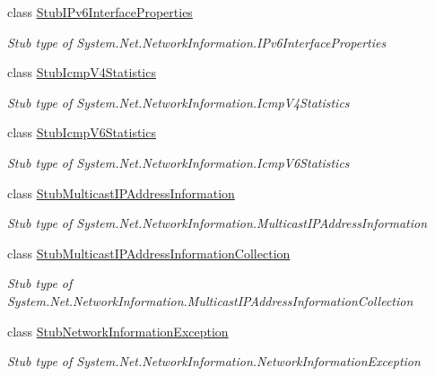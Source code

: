 \begin{DoxyCompactItemize}
class \hyperlink{class_system_1_1_net_1_1_network_information_1_1_fakes_1_1_stub_i_pv6_interface_properties}{Stub\-I\-Pv6\-Interface\-Properties}
\begin{DoxyCompactList}\small\item\em Stub type of System.\-Net.\-Network\-Information.\-I\-Pv6\-Interface\-Properties\end{DoxyCompactList}\item 
class \hyperlink{class_system_1_1_net_1_1_network_information_1_1_fakes_1_1_stub_icmp_v4_statistics}{Stub\-Icmp\-V4\-Statistics}
\begin{DoxyCompactList}\small\item\em Stub type of System.\-Net.\-Network\-Information.\-Icmp\-V4\-Statistics\end{DoxyCompactList}\item 
class \hyperlink{class_system_1_1_net_1_1_network_information_1_1_fakes_1_1_stub_icmp_v6_statistics}{Stub\-Icmp\-V6\-Statistics}
\begin{DoxyCompactList}\small\item\em Stub type of System.\-Net.\-Network\-Information.\-Icmp\-V6\-Statistics\end{DoxyCompactList}\item 
class \hyperlink{class_system_1_1_net_1_1_network_information_1_1_fakes_1_1_stub_multicast_i_p_address_information}{Stub\-Multicast\-I\-P\-Address\-Information}
\begin{DoxyCompactList}\small\item\em Stub type of System.\-Net.\-Network\-Information.\-Multicast\-I\-P\-Address\-Information\end{DoxyCompactList}\item 
class \hyperlink{class_system_1_1_net_1_1_network_information_1_1_fakes_1_1_stub_multicast_i_p_address_information_collection}{Stub\-Multicast\-I\-P\-Address\-Information\-Collection}
\begin{DoxyCompactList}\small\item\em Stub type of System.\-Net.\-Network\-Information.\-Multicast\-I\-P\-Address\-Information\-Collection\end{DoxyCompactList}\item 
class \hyperlink{class_system_1_1_net_1_1_network_information_1_1_fakes_1_1_stub_network_information_exception}{Stub\-Network\-Information\-Exception}
\begin{DoxyCompactList}\small\item\em Stub type of System.\-Net.\-Network\-Information.\-Network\-Information\-Exception\end{DoxyCompactList}\item 

\end{DoxyCompactItemize}

